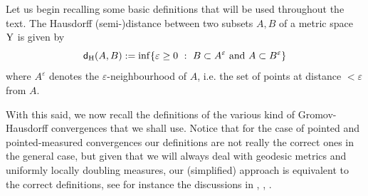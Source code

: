 \documentclass[reqno,11pt]{article}
\numberwithin{equation}{section}
\newcommand{\sfd}{{\sf d}}
\newcommand{\eps}{\varepsilon}
\newcommand{\Y}{{\rm Y}}
\begin{document}
Let us begin recalling some basic definitions that will be used throughout the text. The Hausdorff (semi-)distance between two subsets $A,B$ of a metric space $\Y$ is given by
\[
\sfd_{\rm H}(A,B):=\inf\{\eps\geq 0\ :\ B\subset A^\eps\text{ and } A\subset B^\eps\}
\]
where $A^\eps$ denotes the $\eps$-neighbourhood of $A$, i.e. the  set of points at distance $<\eps$ from $A$.

With this said, we now  recall the definitions of the various kind of Gromov-Hausdorff convergences that we shall use. Notice that for the case of pointed and pointed-measured convergences our definitions are not really the correct ones in the general case, but given that we will always deal with geodesic metrics and uniformly locally doubling measures, our (simplified) approach is equivalent to the correct definitions, see for instance the discussions in \cite[Chapter 3]{Gromov07}, \cite[Section 8.1]{BBI01}, \cite[Section 3.5]{GMS15}.
\end{document}
